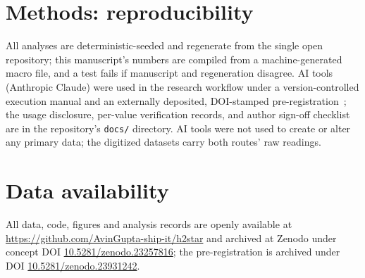 \documentclass[preprint,12pt]{elsarticle}
\begin{document}
\section*{Methods: reproducibility}

All analyses are deterministic-seeded and regenerate from the single open
repository; this manuscript's numbers are compiled from a machine-generated
macro file, and a test fails if manuscript and regeneration disagree. AI tools (Anthropic Claude) were used in the
research workflow under a version-controlled execution manual and an
externally deposited, DOI-stamped pre-registration~\cite{prereg}; the
usage disclosure, per-value verification records, and author sign-off
checklist are in the repository's \texttt{docs/} directory. AI
tools were not used to create or alter any primary data; the digitized
datasets carry both routes' raw readings.

\section*{Data availability}

All data, code, figures and analysis records are openly available at
\url{https://github.com/AvinGupta-ship-it/h2star} and archived at Zenodo
under concept DOI \url{10.5281/zenodo.23257816}; the pre-registration is
archived under DOI \url{10.5281/zenodo.23931242}.
\end{document}
